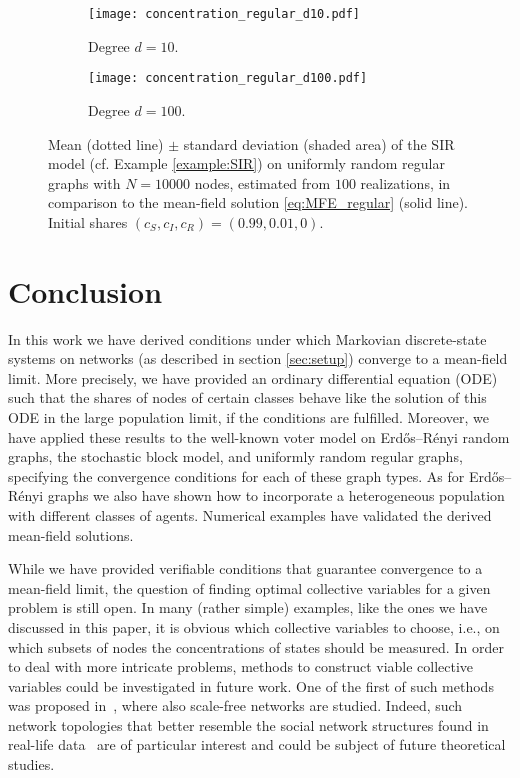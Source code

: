 \documentclass[a4paper,
               10pt,
               pdftex,
               normalheadings,
               headsepline,
               footsepline,
               headinclude,
               footinclude,
               DIV=14,
               abstracton]
{scrartcl}
\newcommand{\review}[1]{{#1}}
\begin{document}
\begin{figure}
     \centering
     \begin{subfigure}[t]{0.49\textwidth}
         \centering
         \texttt{[image: concentration\_regular\_d10.pdf]}
         \caption{Degree $d = 10$.}
     \end{subfigure}
     \hfill
     \begin{subfigure}[t]{0.49\textwidth}
         \centering
         \texttt{[image: concentration\_regular\_d100.pdf]}
         \caption{Degree $d = 100$.}
     \end{subfigure}
        \caption{Mean (dotted line) $\pm$ standard deviation (shaded area) of the SIR model (cf. Example \ref{example:SIR}) on uniformly random regular graphs with $N=10000$ nodes, estimated from $100$ realizations, in comparison to the mean-field solution \eqref{eq:MFE_regular} (solid line). Initial shares $(c_S, c_I, c_R) = (0.99, 0.01, 0)$.}
        \label{fig:concentration_regular}
\end{figure}


\section{Conclusion} \label{sec:conclusion}
In this work we have derived conditions under which Markovian discrete-state systems on networks (as described in section \ref{sec:setup}) converge to a mean-field limit. More precisely, we have provided an ordinary differential equation (ODE) such that the shares of nodes of certain classes behave like the solution of this ODE in the large population limit, if the conditions are fulfilled.
Moreover, we have applied these results to the well-known voter model on Erd\H{o}s--Rényi random graphs, the stochastic block model, and uniformly random regular graphs, specifying the convergence conditions for each of these graph types. As for Erd\H{o}s--Rényi graphs we also have shown how to incorporate a heterogeneous population with different classes of agents. 
Numerical examples have validated the derived mean-field solutions.

While we have provided verifiable conditions that guarantee convergence to a mean-field limit, the question of finding optimal collective variables for a given problem is still open. In many (rather simple) examples, like the ones we have discussed in this paper, it is obvious which collective variables to choose, i.e., on which subsets of nodes the concentrations of states should be measured. In order to deal with more intricate problems, methods to construct viable collective variables could be investigated in future work. \review{One of the first of such methods was proposed in~\cite{Luecke2023}, where also scale-free networks are studied. Indeed, such network topologies that better resemble the social network structures found in real-life data~\cite{Mislove2007} are of particular interest and could be subject of future theoretical studies}.
\end{document}
